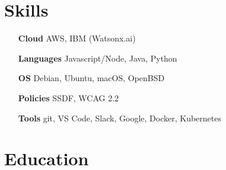 \documentclass[letterpaper,10pt]{article}
\begin{document}

    \section{Skills}

    \begin{multicols}{2}
        \begin{itemize}[itemsep=-2px, parsep=1pt, leftmargin=75pt]
        \item[\textbf{Cloud}] AWS, IBM (Watsonx.ai)
        \item[\textbf{Languages}] Javascript/Node, Java, Python
        \item[\textbf{OS}] Debian, Ubuntu, macOS, OpenBSD
        \item[\textbf{Policies}] SSDF, WCAG 2.2
        \item[\textbf{Tools}] git, VS Code, Slack, Google, Docker, Kubernetes 
        \end{itemize}
    \end{multicols}
  

  \section{Education}



\end{document}
